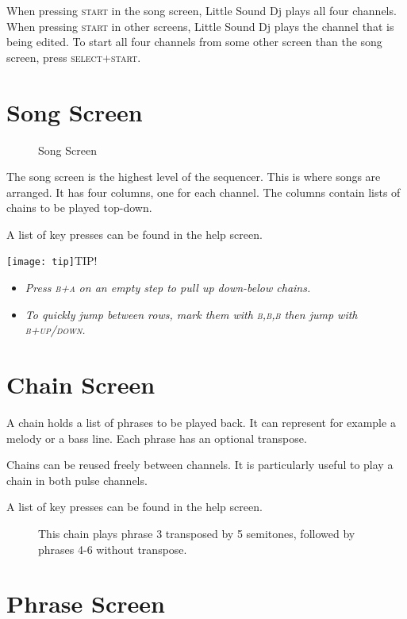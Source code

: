 When pressing \textsc{start} in the song screen, Little Sound Dj plays all four
channels. When pressing \textsc{start} in other screens, Little Sound Dj plays the
channel that is being edited.
To start all four channels from some other screen than the song screen,
press \textsc{select+start}.

\section{Song Screen}

\begin{figure}[hbtp]
\centering
{}
\caption{Song Screen}
\end{figure}

The song screen is the highest level of the sequencer. This is where songs are arranged.
It has four columns, one for each channel. The columns contain lists of chains to be played top-down.

A list of key presses can be found in the help screen.

\texttt{[image: tip]}TIP!
\begin{itemize}
	\item \textit{Press \textsc{b+a} on an empty step to pull up down-below chains.}
	\item \textit{To quickly jump between rows, mark them with \textsc{b,b,b} then jump with \textsc{b+up/down}.}
\end{itemize}

\section{Chain Screen}
A chain holds a list of phrases to be played back. It can represent for example a melody or a bass line. Each phrase has an optional transpose.

Chains can be reused freely between channels. It is particularly useful to play a chain in both pulse channels.

A list of key presses can be found in the help screen.

\begin{figure}[hbtp]
\centering
{}
	\caption{This chain plays phrase 3 transposed by 5 semitones, followed by phrases 4-6 without transpose.}
\end{figure}

\section{Phrase Screen}

